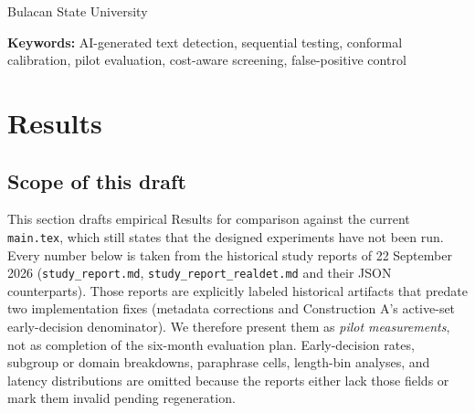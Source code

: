 \documentclass[pdflatex,sn-mathphys-num]{sn-jnl}
\begin{document}
  \begin{center}
    Bulacan State University
  \end{center}
  \begin{abstract}
    This draft proposes a Results section for the adaptive within-document screening manuscript. It reports a historical pilot evaluation of Construction B against the fixed \texttt{ll@1024} comparator under the preregistered joint criterion of at least twenty percent mean online cost reduction with a one-sided ninety-five percent confidence lower bound for the paired power difference above \(-0.02\). The pilot used a GPT-2 scorer, calibration size \(m=1600\), development size \(100\), \(n=150\) documents per class, four registered detectors, three corpora, clean and synthetic mixed variants, and nominal levels \(0.05\), \(0.01\), and \(0.001\). Construction B met the joint criterion in fourteen of eighteen cells; all four failures were clean RAID or clean RealDet at \(\alpha\in\{0.001,0.01\}\). Observed human false-alert rates never exceeded the nominal level in any cell, although sample sizes cannot certify low-FPR control. These measurements are historical and predate implementation fixes; the designed multi-corpus study remains incomplete.
  \end{abstract}
  \noindent\textbf{Keywords:} AI-generated text detection, sequential testing, conformal calibration, pilot evaluation, cost-aware screening, false-positive control
\fi

\section{Results}\label{sec:results}

\subsection{Scope of this draft}

This section drafts empirical Results for comparison against the current \texttt{main.tex}, which still states that the designed experiments have not been run. Every number below is taken from the historical study reports of 22 September 2026 (\texttt{study\_report.md}, \texttt{study\_report\_realdet.md} and their JSON counterparts). Those reports are explicitly labeled historical artifacts that predate two implementation fixes (metadata corrections and Construction A's active-set early-decision denominator). We therefore present them as \emph{pilot measurements}, not as completion of the six-month evaluation plan. Early-decision rates, subgroup or domain breakdowns, paraphrase cells, length-bin analyses, and latency distributions are omitted because the reports either lack those fields or mark them invalid pending regeneration.
\end{document}
